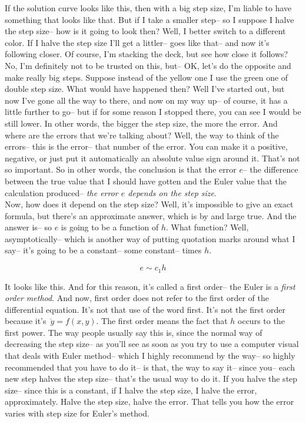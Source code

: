 If the solution curve looks like this, then
with a big step size, I'm liable to have
something that looks like that.
But if I take a smaller step-- so I suppose I halve the step
size--
how is it going to look then?
Well, I better switch to a different color.
If I halve the step size I'll get a littler--
goes like that-- and now it's following closer.
Of course, I'm stacking the deck,
but see how close it follows?
No, I'm definitely not to be trusted on this, but--
OK, let's do the opposite and make really big steps.
Suppose instead of the yellow one
I use the green one of double step size.
What would have happened then?
Well I've started out, but now I've
gone all the way to there, and now on my way up-- of course,
it has a little further to go-- but if for some reason
I stopped there, you can see I would be still lower.
In other words, the bigger the step size, the more the error.
And where are the errors that we're talking about?
Well, the way to think of the errors--
this is the error--
that number of the error.
You can make it a positive, negative,
or just put it automatically an absolute value sign around it.
That's not so important.
So in other words, the conclusion
is that the error $e$--
the difference between the true value that I should have gotten
and the Euler value that the calculation produced--
\emph{the error $e$ depends on the step size}. \\
Now, how does it depend on the step size?
Well, it's impossible to give an exact formula,
but there's an approximate answer,
which is by and large true.
And the answer is--
so $e$ is going to be a function of $h$.
What function?
Well, asymptotically-- which is another way of putting
quotation marks around what I say--
it's going to be a constant-- some constant--
times $h$.

\begin{equation*}
  e \sim c_1 h 
\end{equation*}

It looks like this.
And for this reason, it's called a first order--
the Euler is a \emph{first order method}.
And now, first order does not refer to the first order of the differential equation.
It's not that use of the word first.
It's not the first order because it's $\, \dot y = f(x, y)$. 
The first order means the fact that $h$ occurs to the first power.
The way people usually say this is, since the normal way
of decreasing the step size--
as you'll see as soon as you try to use a computer visual that
deals with Euler method-- which I highly recommend by the way--
so highly recommended that you have to do it--
is that, the way to say it--
since you-- each new step halves the step size--
that's the usual way to do it.
If you halve the step size--
since this is a constant, if I halve the step size,
I halve the error, approximately.
Halve the step size, halve the error.
That tells you how the error varies with step size for Euler's method. \\

